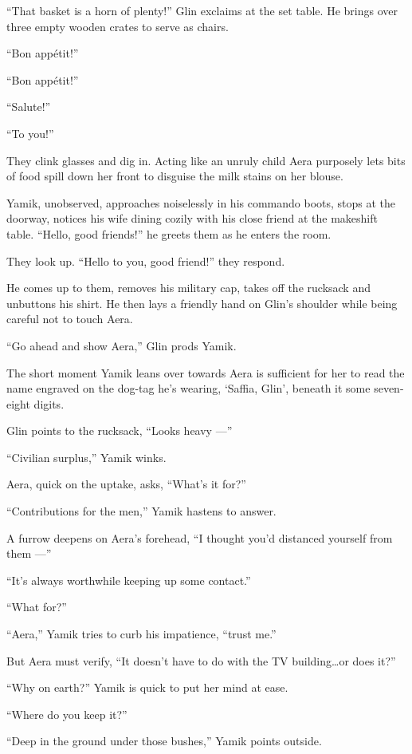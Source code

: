 \documentclass[twoside,11pt,openany]{book}
\begin{document}
``That basket is a horn of plenty!'' Glin exclaims at the set table. He brings over three
empty wooden crates to serve as chairs.

``Bon app\'etit!''

``Bon app\'etit!''

``Salute!''

``To you!''

They clink glasses and dig in. Acting like an unruly child Aera purposely lets bits of food spill down her front to
disguise the milk stains on her blouse.

Yamik, unobserved, approaches noiselessly in his commando boots, stops at the doorway, notices his wife dining cozily
with his close friend at the makeshift table. ``Hello, good friends!'' he greets them as he
enters the room.

They look up. ``Hello to you,{ }good{ }friend!'' they respond.

He comes up to them, removes{ }his military cap, takes off the rucksack and
unbuttons his shirt. He then lays a friendly hand on Glin's shoulder while being careful not to touch Aera.

``Go ahead and show Aera,'' Glin prods Yamik.

The short moment Yamik leans over towards Aera is sufficient for her to read the name engraved on the
dog-tag he's wearing, `Saffia, Glin', beneath it some seven-eight digits.

Glin points to the rucksack, ``Looks heavy ---''

``Civilian surplus,'' Yamik winks.

Aera, quick on the uptake, asks, ``What's it for?''

``Contributions for the men,'' Yamik hastens to answer.

A furrow deepens on Aera's forehead, ``I thought you'd distanced yourself from them ---''

``It's always worthwhile keeping up some contact.''

``What for?''

``Aera,'' Yamik tries to curb his impatience, ``trust me.''

But Aera must verify, ``It doesn't have to do with
the TV building{\ldots}or does it?''

``Why on earth?'' Yamik is quick to put her mind at ease.

``Where do you keep it?''

``Deep in  the ground under those bushes,'' Yamik points outside.
\end{document}

